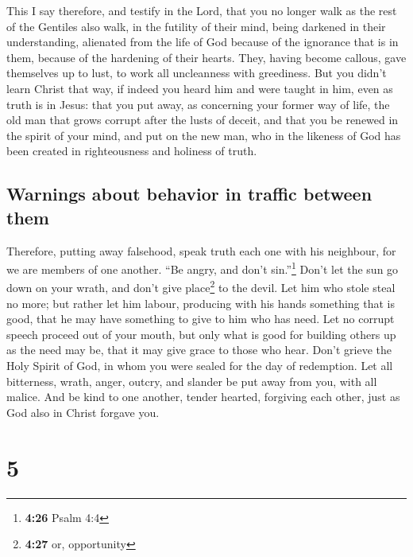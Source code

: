  This I say therefore, and testify in the Lord, that you
no longer walk as the rest of the Gentiles also walk, in the futility of
their mind,  being darkened in their understanding,
alienated from the life of God because of the ignorance that is in them,
because of the hardening of their hearts.  They, having
become callous, gave themselves up to lust, to work all uncleanness with
greediness.  But you didn't learn Christ that way,
 if indeed you heard him and were taught in him, even as
truth is in Jesus:  that you put away, as concerning your
former way of life, the old man that grows corrupt after the lusts of
deceit,  and that you be renewed in the spirit of your
mind,  and put on the new man, who in the likeness of God
has been created in righteousness and holiness of truth.

\hypertarget{warnings-about-behavior-in-traffic-between-them}{%
\subsection{Warnings about behavior in traffic between
them}\label{warnings-about-behavior-in-traffic-between-them}}

 Therefore, putting away falsehood, speak truth each one
with his neighbour, for we are members of one another. 
``Be angry, and don't sin.''\footnote{\textbf{4:26} Psalm 4:4} Don't let
the sun go down on your wrath,  and don't give
place\footnote{\textbf{4:27} or, opportunity} to the devil.
 Let him who stole steal no more; but rather let him
labour, producing with his hands something that is good, that he may
have something to give to him who has need.  Let no
corrupt speech proceed out of your mouth, but only what is good for
building others up as the need may be, that it may give grace to those
who hear.  Don't grieve the Holy Spirit of God, in whom
you were sealed for the day of redemption.  Let all
bitterness, wrath, anger, outcry, and slander be put away from you, with
all malice.  And be kind to one another, tender hearted,
forgiving each other, just as God also in Christ forgave you.

\hypertarget{section-4}{%
\section{5}\label{section-4}}

